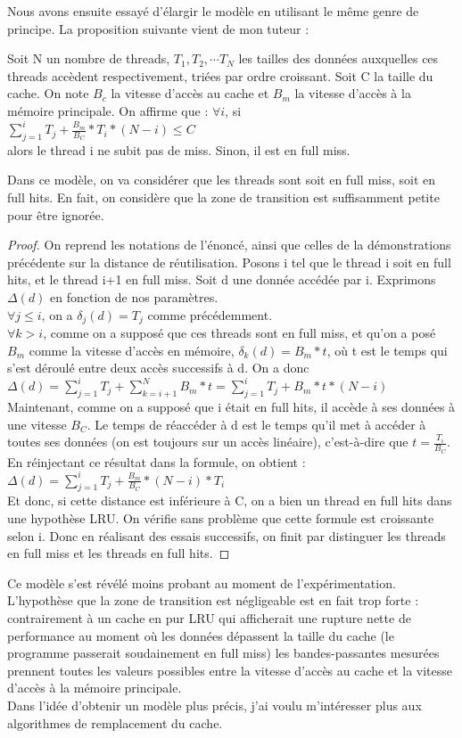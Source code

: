 \documentclass{report}
\begin{document}
Nous avons ensuite essayé d'élargir le modèle en utilisant le même genre de principe. La
proposition suivante vient de mon tuteur :
\begin{th2}
Soit N un nombre de threads, $T_1, T_2, \cdots T_N$ les tailles des données auxquelles ces threads
accèdent respectivement, triées par ordre croissant. Soit C la taille du cache. On note $B_c$ la 
vitesse d'accès au cache et $B_m$ la vitesse d'accès à la mémoire principale. On affirme que :
$\forall i$, si 
\\$\sum_{j=1}^{i}{T_{j}} + \frac{B_m}{B_C} * T_i * (N - i) \leq C$
\\alors le thread i ne subit pas de miss. Sinon, il est en full miss.
\end{th2}

Dans ce modèle, on va considérer que les threads sont soit en full miss, soit en full hits.
En fait, on considère que la zone de transition est suffisamment petite pour être ignorée.
\begin{proof}
  On reprend les notations de l'énoncé, ainsi que celles de la démonstrations précédente sur
  la distance de réutilisation.
  Posons i tel que le thread i soit en full hits, et le thread i+1 en full miss. Soit d une 
  donnée accédée par i. Exprimons $\Delta(d)$ en fonction de nos paramètres.
\\  $\forall j \leq i$, on a $\delta_j(d) = T_j$ comme précédemment.
 \\ $\forall k > i$, comme on a supposé que ces threads sont en full miss, et qu'on a posé
 $B_m$ comme la vitesse d'accès en mémoire, $\delta_k(d)=B_m * t$, où t est le temps qui 
 s'est déroulé entre deux accès successifs à d.
 On a donc $\Delta(d)= \sum_{j=1}^{i}{T_j} + \sum_{k=i+1}^{N}{B_m * t} = \sum_{j=1}^{i}{T_j}
 + B_m * t * (N - i)$
 \\Maintenant, comme on a supposé que i était en full hits, il accède à ses données à une
 vitesse $B_C$. Le temps de réaccéder à d est le temps qu'il met à accéder à toutes ses
 données (on est toujours sur un accès linéaire), c'est-à-dire que $t= \frac{T_i}{B_C}$.
 En réinjectant ce résultat dans la formule, on obtient :
 \\ $\Delta(d)=  \sum_{j=1}^{i}{T_j} + \frac{B_m}{B_C} * (N - i) * T_i $
 \\Et donc, si cette distance est inférieure à C, on a bien un thread en full hits dans
 une hypothèse LRU. On vérifie sans problème que cette formule est croissante selon i. 
 Donc en réalisant des essais successifs, on finit par distinguer les threads en full
 miss et les threads en full hits. 
\end{proof}
Ce modèle s'est révélé moins probant au moment de l'expérimentation. L'hypothèse 
que la zone de transition est négligeable est en fait trop forte : contrairement à
un cache en pur LRU qui afficherait une rupture nette de performance au moment où
les données dépassent la taille du cache (le programme passerait soudainement en 
full miss) les bandes-passantes mesurées prennent toutes les valeurs possibles entre la 
vitesse d'accès au cache et la vitesse d'accès à la mémoire principale. 
\\Dans l'idée d'obtenir un modèle plus précis, j'ai voulu m'intéresser plus aux algorithmes
de remplacement du cache.
\end{document}
